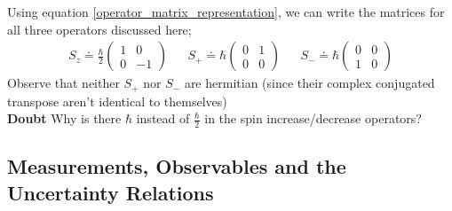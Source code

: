 \documentclass[12pt]{article}
\begin{document}
				Using equation \ref{operator_matrix_representation}, we can write the matrices for all three operators discussed here;
				\begin{align}
				S_z \doteq
				\frac \hbar 2
				\left(
				\begin{array}{cc}
					1 &0 \\
					0 &-1
				\end{array}
				\right)
				& &S_+ \doteq
				\hbar
				\left(
				\begin{array}{cc}
					0 &1 \\
					0 &0
				\end{array}
				\right)
				& &S_- \doteq
				\hbar
				\left(
				\begin{array}{cc}
					0 &0 \\
					1 &0
				\end{array}
				\right)
				\end{align}
				Observe that neither $S_+$ nor $S_-$ are hermitian (since their complex conjugated transpose aren't identical to themselves)\\
				{\bf Doubt} Why is there $\hbar$ instead of $\displaystyle \frac \hbar 2$ in the spin increase/decrease operators?
		\subsection{Measurements, Observables and the Uncertainty Relations}
\end{document}
